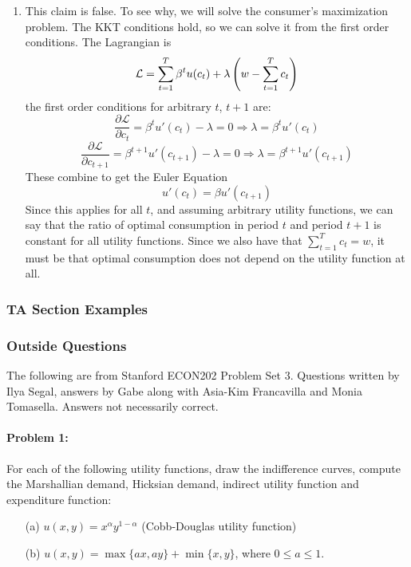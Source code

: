 \documentclass[12pt]{article}
\begin{document}
\begin{enumerate}
\begin{enumerate}
		\item This claim is false. To see why, we will solve the consumer's maximization problem. The KKT conditions hold, so we can solve it from the first order conditions. The Lagrangian is
		\[
		\mathcal{L} = \sum_{t=1}^T \beta^t u(c_t) + \lambda \left( w - \sum_{t=1}^T c_t\right) 
		\]
		the first order conditions for arbitrary $t$, $t+1$ are:
		\[
		\frac{\partial \mathcal{L}}{\partial c_t} = \beta^t u'(c_t) - \lambda  = 0 \Longrightarrow \lambda = \beta^t u'(c_t)
		\]
		\[
		\frac{\partial \mathcal{L}}{\partial c_{t+1}} = \beta^{t+1} u'(c_{t+1}) - \lambda = 0 \Longrightarrow \lambda = \beta^{t+1} u'(c_{t+1})
		\]
		These combine to get the Euler Equation
		\[
		u'(c_t) = \beta u'(c_{t+1})
		\]
		Since this applies for all $t$, and assuming arbitrary utility functions, we can say that the ratio of optimal consumption in period $t$ and period $t+1$ is constant for all utility functions. Since we also have that $\sum_{t=1}^T c_t = w$, it must be that optimal consumption does not depend on the utility function at all.
	\end{enumerate}
\end{enumerate}

\subsubsection{TA Section Examples}

\subsubsection{Outside Questions}

The following are from Stanford ECON202 Problem Set 3. Questions written by Ilya Segal, answers by Gabe along with Asia-Kim Francavilla and Monia Tomasella. Answers not necessarily correct.

\paragraph{Problem 1:} For each of the following utility functions, draw the indifference curves, compute the Marshallian demand, Hicksian demand, indirect utility function and expenditure function:
\begin{itemize}
    \item[(a)] $u(x,y) = x^\alpha y^{1-\alpha}$ (Cobb-Douglas utility function)

    \item[(b)] $u(x,y) = \max\{a x,ay\} + \min\{x,y\} $, where $0 \le a \le 1$.
\end{itemize}
\end{document}
